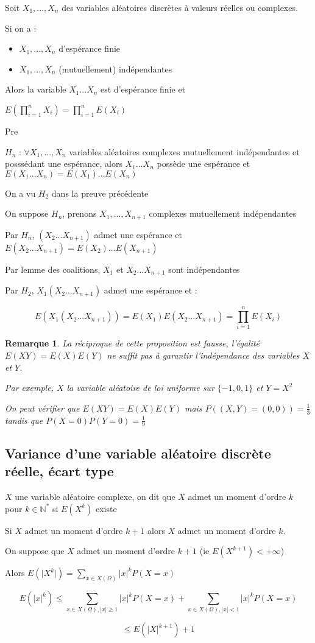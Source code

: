\documentclass[a4paper,12pt]{book}
\newcommand{\Def}[2]{\begin{tcolorbox}[sharp corners, colback=white,colframe=blue!90!black!75, title=Définition : #1]#2\end{tcolorbox}}
\newcommand{\Thr}[2]{\begin{tcolorbox}[sharp corners, colback=white,colframe=red!90!black!75, title=Théorème : #1]#2\end{tcolorbox}}
\newcommand{\Pre}[1]{\begin{tcolorbox}[sharp corners, colback=white,colframe=green!60!green!30!black!75, title=Preuve]#1\end{tcolorbox}}
\newtheorem{Rem}{Remarque}[section]
\def\N{\mathbb{N}}
\begin{document}
\Thr{Espérance d'un produit de n variables indépendantes}{Soit $X_1,...,X_n$ des variables aléatoires discrètes à valeurs réelles ou complexes.
\par Si on a :\begin{itemize}
\item $X_1,..., X_n$ d'espérance finie
\item $X_1,..., X_n$ (mutuellement) indépendantes
\end{itemize}
Alors la variable $X_1...X_n$ est d'espérance finie et \par\begin{center}$E\left(\prod\limits_{i=1}^nX_i\right)=\prod\limits_{i=1}^nE(X_i)$\end{center}}
Pre{$H_n$ : $\forall X_1,..., X_n$ variables aléatoires complexes mutuellement indépendantes et posssédant une espérance, alors $X_1...X_n$ possède une espérance et $E(X_1...X_n)=E(X_1)...E(X_n)$
\par On a vu $H_2$ dans la preuve précédente
\par On suppose $H_n$, prenons $X_1,..., X_{n+1}$ complexes mutuellement indépendantes
\par Par $H_n$, $(X_2...X_{n+1})$ admet une espérance et $E(X_2...X_{n+1})=E(X_2)...E(X_{n+1})$
\par Par lemme des coalitions, $X_1$ et $X_2...X_{n+1}$ sont indépendantes
\par Par $H_2$, $X_1(X_2...X_{n+1})$ admet une espérance et :
\par $$E(X_1(X_2...X_{n+1}))=E(X_1)E(X_2...X_{n+1}) = \prod\limits_{i=1}^nE(X_i)$$}
\begin{Rem}
La réciproque de cette proposition est fausse, l'égalité $E(XY)=E(X)E(Y)$ ne suffit pas à garantir l'indépendance des variables $X$ et $Y$.
\par Par exemple, $X$ la variable aléatoire de loi uniforme sur $\{-1,0,1\}$ et $Y=X^2$
\par On peut vérifier que $E(XY)=E(X)E(Y)$ mais $P((X,Y)=(0,0))=\frac{1}{3}$ tandis que $P(X=0)P(Y=0) = \frac{1}{9}$
\end{Rem}

\subsection{Variance d'une variable aléatoire discrète réelle, écart type}
\Def{}{$X$ une variable aléatoire complexe, on dit que $X$ admet un moment d'ordre $k$ pour $k\in\N^*$ si $E(X^k)$ existe}
\Thr{}{Si $X$ admet un moment d'ordre $k+1$ alors $X$ admet un moment d'ordre $k$.}
\Pre{On suppose que $X$ admet un moment d'ordre $k+1$ (ie $E(X^{k+1}) < +\infty$)
\par Alors $E(\vert X^k\vert) = \sum\limits_{x\in X(\Omega)}\vert x\vert^kP(X=x)$
\par $$ E(\vert x\vert^k)\leq \sum\limits_{x\in X(\Omega), \vert x\vert \geq 1} \vert x\vert^kP(X=x) +\sum\limits_{x\in X(\Omega), \vert x\vert<1} \vert x\vert^kP(X=x)$$
\par $$ \leq E(\vert X\vert^{k+1})+1$$}
\end{document}
